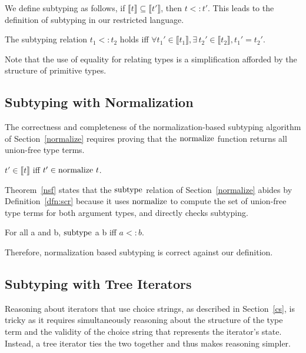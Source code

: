 \documentclass[a4paper,english]{lipics-v2019}
\newcommand{\denotes}[1]{\llbracket #1 \rrbracket}
\renewcommand{\c}[1]{\ensuremath{\text{\lstinline{#1}}}\xspace}
\begin{document}
\noindent
We define subtyping as follows, if $\denotes{t}\subseteq\denotes{t'}$, then
$t<:t'$.  This leads to the definition of subtyping in our restricted language.

\begin{definition}
The subtyping relation $t_1 <: t_2$ holds iff $\forall t_1' \in
\denotes{t_1}, \exists\, t_2' \in \denotes{t_2}, t_1' =
t_2'$.\label{dfn:scr}
\end{definition}

\noindent
Note that the use of equality for relating types is a simplification
afforded by the structure of primitive types.

\subsection{Subtyping with Normalization}

The correctness and completeness of the normalization-based subtyping
algorithm of Section~\ref{normalize} requires proving that the \c{normalize}
function returns all union-free type terms.

\begin{lemma}[NF Equivalence]\label{lem:equiv_ndet}
$t' \in \denotes{t}$ iff $t' \in \c{normalize}~ t$.
\end{lemma}

\noindent
Theorem~\ref{nsf} states that the \c{subtype} relation of
Section~\ref{normalize} abides by Definition~\ref{dfn:scr} because it uses
\c{normalize} to compute the set of union-free type terms for both argument
types, and directly checks subtyping.

\begin{theorem}[NF Subtyping]\label{nsf}
For all  a and b, \c{subtype} a b iff $a <: b$.
\end{theorem}

\noindent
Therefore, normalization based subtyping is correct against our definition.


\subsection{Subtyping with Tree Iterators}

Reasoning about iterators that use choice strings, as described in
Section~\ref{cs}, is tricky as it requires simultaneously reasoning about
the structure of the type term and the validity of the choice string that
represents the iterator's state. Instead, a tree iterator ties the two
together and thus makes reasoning simpler. 
\end{document}
